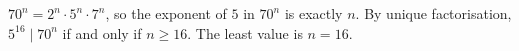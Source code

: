 $70^n=2^n\cdot5^n\cdot7^n$, so the exponent of $5$ in $70^n$ is exactly $n$. By unique factorisation, $5^{16}\mid70^n$ if and only if $n\ge16$. The least value is $n=\boxed{16}$.
